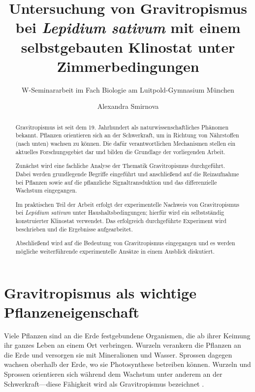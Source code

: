 \documentclass[
11pt, 
ngerman,
listof=totocnumbered,
oneside,
bibliography=totocnumbered,
abstracton
]{scrreprt}
\title{Untersuchung von Gravitropismus bei \emph{Lepidium sativum} mit einem selbstgebauten Klinostat unter Zimmerbedingungen}
\subtitle{W-Seminararbeit im Fach Biologie am Luitpold-Gymnasium München}
\author{Alexandra Smirnova}
\begin{document}
	



\begingroup
\renewcommand*{\chapterpagestyle}{empty}
\pagestyle{empty}
\tableofcontents
\clearpage
\endgroup
	
\renewcommand\abstractname{Abstract}
\begin{abstract}

Gravitropismus ist seit dem 19. Jahrhundert als naturwissenschaftliches Phänomen bekannt. Pflanzen orientieren sich an der Schwerkraft, um in Richtung von Nährstoffen ({\glqq nach unten\grqq}) wachsen zu können. Die dafür verantwortlichen Mechanismen stellen ein aktuelles Forschungsgebiet dar und bilden die Grundlage der vorliegenden Arbeit. 

Zunächst wird eine fachliche Analyse der Thematik Gravitropismus durchgeführt. Dabei werden grundlegende Begriffe eingeführt und anschließend auf die Reizaufnahme bei Pflanzen sowie auf die pflanzliche Signaltransduktion und das differenzielle Wachstum eingegangen. 

Im praktischen Teil der Arbeit erfolgt der experimentelle Nachweis von Gravitropismus bei \emph{Lepidium sativum} unter Haushaltsbedingungen; hierfür wird ein selbstständig konstruierter Klinostat verwendet. Das erfolgreich durchgeführte Experiment wird beschrieben und die Ergebnisse aufgearbeitet. 

Abschließend wird auf die Bedeutung von Gravitropismus eingegangen und es werden mögliche weiterführende experimentelle Ansätze in einem Ausblick diskutiert. 
	
\end{abstract}


\chapter{Gravitropismus als wichtige Pflanzeneigenschaft}

Viele Pflanzen sind an die Erde festgebundene Organismen, die ab ihrer Keimung ihr ganzes Leben an einem Ort verbringen. Wurzeln verankern die Pflanzen an die Erde und versorgen sie mit Mineralionen und Wasser. Sprossen dagegen wachsen oberhalb der Erde, wo sie Photosynthese betreiben können. Wurzeln und Sprossen orientieren sich während dem Wachstum unter anderem an der Schwerkraft---diese Fähigkeit wird als Gravitropismus bezeichnet \parencite[2]{Masson2002}. 
\end{document}
